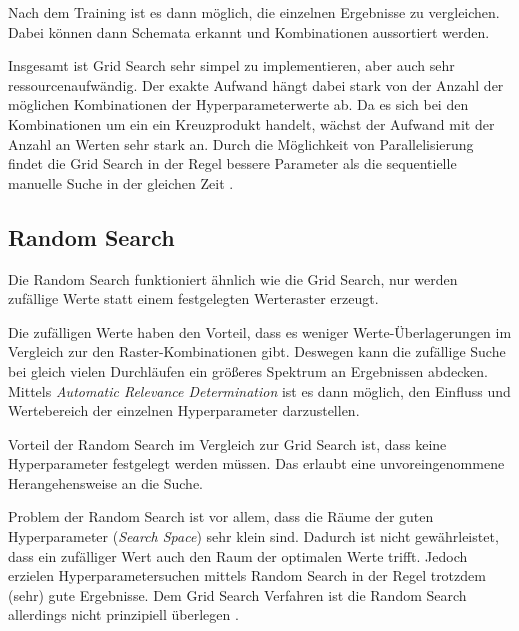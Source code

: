 Nach dem Training ist es dann möglich, die einzelnen Ergebnisse zu vergleichen.
Dabei können dann Schemata erkannt und Kombinationen aussortiert werden.
\newline

Insgesamt ist Grid Search sehr simpel zu implementieren, aber auch sehr ressourcenaufwändig.
Der exakte Aufwand hängt dabei stark von der Anzahl der möglichen Kombinationen der Hyperparameterwerte ab.
Da es sich bei den Kombinationen um ein ein Kreuzprodukt handelt, wächst der Aufwand mit der Anzahl an Werten sehr stark an.
Durch die Möglichkeit von Parallelisierung findet die Grid Search in der Regel bessere Parameter als die sequentielle manuelle Suche in der gleichen Zeit \cite{hyperparameters-random-search}.

\subsection{Random Search}
Die Random Search \cite{hyperparameters-random-search} funktioniert ähnlich wie die Grid Search, nur werden zufällige Werte statt einem festgelegten Werteraster erzeugt.
\newline

Die zufälligen Werte haben den Vorteil, dass es weniger Werte-Überlagerungen im Vergleich zur den Raster-Kombinationen gibt.
Deswegen kann die zufällige Suche bei gleich vielen Durchläufen ein größeres Spektrum an Ergebnissen abdecken.
Mittels \textit{Automatic Relevance Determination} \cite{automatic-relevance-determination} ist es dann möglich, den Einfluss und Wertebereich der einzelnen Hyperparameter darzustellen.
\newline

Vorteil der Random Search im Vergleich zur Grid Search ist, dass keine Hyperparameter festgelegt werden müssen.
Das erlaubt eine unvoreingenommene Herangehensweise an die Suche.

Problem der Random Search ist vor allem, dass die Räume der guten Hyperparameter (\textit{Search Space}) sehr klein sind.
Dadurch ist nicht gewährleistet, dass ein zufälliger Wert auch den Raum der optimalen Werte trifft.
Jedoch erzielen Hyperparametersuchen mittels Random Search in der Regel trotzdem (sehr) gute Ergebnisse.
Dem Grid Search Verfahren ist die Random Search allerdings nicht prinzipiell überlegen \cite{hyperparameters-random-search}.


